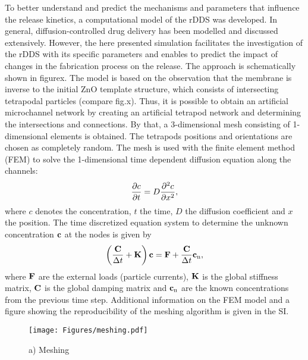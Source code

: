 \documentclass{article}
\begin{document}

  To better understand and predict the mechanisms and parameters that influence the release kinetics, a computational model of the rDDS was developed. In general, diffusion-controlled drug delivery has been modelled and discussed extensively. However, the here presented simulation facilitates the investigation of the rDDS with its specific parameters and enables to predict the impact of changes in the fabrication process on the release. The approach is schematically shown in figurex. The model is based on the observation that the membrane is inverse to the initial ZnO template structure, which consists of intersecting tetrapodal particles (compare fig.x). Thus, it is possible to obtain an artificial microchannel network by creating an artificial tetrapod network and determining the intersections and connections. By that, a 3-dimensional mesh consisting of 1-dimensional elements is obtained. The tetrapods positions and orientations are chosen as completely random. The mesh is used with the finite element method (FEM) to solve the 1-dimensional time dependent diffusion equation along the channels: 
  \begin{equation}
    \frac{\partial c}{\partial t} = D \frac{\partial^2c}{\partial{x}^2},
  \end{equation}
  where $c$ denotes the concentration, $t$ the time, $D$ the diffusion coefficient and $x$ the position. The time discretized equation system to determine the unknown concentration $\boldsymbol{\rm c}$ at the nodes is given by
  \begin{equation}
    \left (\frac{\boldsymbol{\rm C}}{\Delta t}+\boldsymbol{\rm K} \right) \boldsymbol{\rm c} = \boldsymbol{\rm F}+\frac{\boldsymbol{\rm C}}{\Delta t}\boldsymbol{\rm c}_{\rm n},
  \end{equation}
  where $\boldsymbol{\rm F}$ are the external loads (particle currents), $\boldsymbol{\rm K}$ is the global stiffness matrix, $\boldsymbol{\rm C}$ is the global damping matrix and $\boldsymbol{\rm c}_{\rm n}$ are the known concentrations from the previous time step. Additional information on the FEM model and a figure showing the reproducibility of the meshing algorithm is given in the SI. 

  \begin{figure}[h!]
    \centering
    \texttt{[image: Figures/meshing.pdf]}
    \caption[]{a) Meshing }
  \end{figure}
\end{document}
